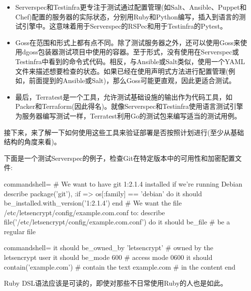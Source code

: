 \begin{itemize}
\item 
Serverspec和Testinfra更专注于测试通过配置管理(如Salt、Ansible、Puppet和Chef)配置的服务器的实际状态，分别用Ruby和Python编写，插入到语言的测试引擎中。这意味着用于Serverspec的RSPec和用于Testinfra的Pytest。

\item 
Goss在范围和形式上都有点不同。除了测试服务器之外，还可以使用Goss来使用dgoss包装器测试项目中使用的容器。至于形式，没有使用在Serverspec或Testinfra中看到的命令式代码。相反，与Ansible或Salt类似，使用一个YAML文件来描述想要检查的状态。如果已经在使用声明式方法进行配置管理(例如，前面提到的Ansible或Salt)，那么Goss可能更直观，因此更适合测试。

\item 
最后，Terratest是一个工具，允许测试基础设施的输出作为代码工具，如Packer和Terraform(因此得名)。就像Serverspec和Testinfra使用语言测试引擎为服务器编写测试一样，Terratest利用Go的测试包来编写适当的测试用例。
\end{itemize}

接下来，来了解一下如何使用这些工具来验证部署是否按照计划进行(至少从基础结构的角度来看)。


下面是一个测试Serverspec的例子，检查Git在特定版本中的可用性和加密配置文件:

\begin{tcblisting}{commandshell={}}
# We want to have git 1:2.1.4 installed if we're running Debian
describe package('git'), :if => os[:family] == 'debian' do
  it { should be_installed.with_version('1:2.1.4') }
end
# We want the file /etc/letsencrypt/config/example.com.conf to:
describe file('/etc/letsencrypt/config/example.com.conf') do
  it { should be_file } # be a regular file
\end{tcblisting}
\begin{tcblisting}{commandshell={}}
  it { should be_owned_by 'letsencrypt' } # owned by the letsencrypt user
  it { should be_mode 600 } # access mode 0600
  it { should contain('example.com') } # contain the text example.com
                                     # in the content
end
\end{tcblisting}

Ruby DSL语法应该是可读的，即使对那些不日常使用Ruby的人也是如此。


